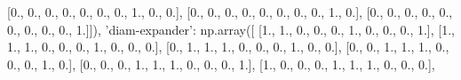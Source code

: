 \documentclass[11pt]{article}
\newenvironment{Shaded}{}{}
\newcommand{\DecValTok}[1]{\textcolor[rgb]{0.25,0.63,0.44}{{#1}}}
\newcommand{\StringTok}[1]{\textcolor[rgb]{0.25,0.44,0.63}{{#1}}}
\newcommand{\NormalTok}[1]{{#1}}
\begin{document}
\begin{Shaded}
\begin{Highlighting}[]
\NormalTok{        [}\DecValTok{0}\NormalTok{., }\DecValTok{0}\NormalTok{., }\DecValTok{0}\NormalTok{., }\DecValTok{0}\NormalTok{., }\DecValTok{0}\NormalTok{., }\DecValTok{0}\NormalTok{., }\DecValTok{0}\NormalTok{., }\DecValTok{1}\NormalTok{., }\DecValTok{0}\NormalTok{., }\DecValTok{0}\NormalTok{.],}
\NormalTok{        [}\DecValTok{0}\NormalTok{., }\DecValTok{0}\NormalTok{., }\DecValTok{0}\NormalTok{., }\DecValTok{0}\NormalTok{., }\DecValTok{0}\NormalTok{., }\DecValTok{0}\NormalTok{., }\DecValTok{0}\NormalTok{., }\DecValTok{0}\NormalTok{., }\DecValTok{1}\NormalTok{., }\DecValTok{0}\NormalTok{.],}
\NormalTok{        [}\DecValTok{0}\NormalTok{., }\DecValTok{0}\NormalTok{., }\DecValTok{0}\NormalTok{., }\DecValTok{0}\NormalTok{., }\DecValTok{0}\NormalTok{., }\DecValTok{0}\NormalTok{., }\DecValTok{0}\NormalTok{., }\DecValTok{0}\NormalTok{., }\DecValTok{0}\NormalTok{., }\DecValTok{1}\NormalTok{.]]),}
    \StringTok{'diam-expander'}\NormalTok{: np.array([}
\NormalTok{        [}\DecValTok{1}\NormalTok{., }\DecValTok{1}\NormalTok{., }\DecValTok{0}\NormalTok{., }\DecValTok{0}\NormalTok{., }\DecValTok{0}\NormalTok{., }\DecValTok{1}\NormalTok{., }\DecValTok{0}\NormalTok{., }\DecValTok{0}\NormalTok{., }\DecValTok{0}\NormalTok{., }\DecValTok{1}\NormalTok{.],}
\NormalTok{        [}\DecValTok{1}\NormalTok{., }\DecValTok{1}\NormalTok{., }\DecValTok{1}\NormalTok{., }\DecValTok{0}\NormalTok{., }\DecValTok{0}\NormalTok{., }\DecValTok{0}\NormalTok{., }\DecValTok{1}\NormalTok{., }\DecValTok{0}\NormalTok{., }\DecValTok{0}\NormalTok{., }\DecValTok{0}\NormalTok{.],}
\NormalTok{        [}\DecValTok{0}\NormalTok{., }\DecValTok{1}\NormalTok{., }\DecValTok{1}\NormalTok{., }\DecValTok{1}\NormalTok{., }\DecValTok{0}\NormalTok{., }\DecValTok{0}\NormalTok{., }\DecValTok{0}\NormalTok{., }\DecValTok{1}\NormalTok{., }\DecValTok{0}\NormalTok{., }\DecValTok{0}\NormalTok{.],}
\NormalTok{        [}\DecValTok{0}\NormalTok{., }\DecValTok{0}\NormalTok{., }\DecValTok{1}\NormalTok{., }\DecValTok{1}\NormalTok{., }\DecValTok{1}\NormalTok{., }\DecValTok{0}\NormalTok{., }\DecValTok{0}\NormalTok{., }\DecValTok{0}\NormalTok{., }\DecValTok{1}\NormalTok{., }\DecValTok{0}\NormalTok{.],}
\NormalTok{        [}\DecValTok{0}\NormalTok{., }\DecValTok{0}\NormalTok{., }\DecValTok{0}\NormalTok{., }\DecValTok{1}\NormalTok{., }\DecValTok{1}\NormalTok{., }\DecValTok{1}\NormalTok{., }\DecValTok{0}\NormalTok{., }\DecValTok{0}\NormalTok{., }\DecValTok{0}\NormalTok{., }\DecValTok{1}\NormalTok{.],}
\NormalTok{        [}\DecValTok{1}\NormalTok{., }\DecValTok{0}\NormalTok{., }\DecValTok{0}\NormalTok{., }\DecValTok{0}\NormalTok{., }\DecValTok{1}\NormalTok{., }\DecValTok{1}\NormalTok{., }\DecValTok{1}\NormalTok{., }\DecValTok{0}\NormalTok{., }\DecValTok{0}\NormalTok{., }\DecValTok{0}\NormalTok{.],}

\end{Highlighting}
\end{Shaded}
\end{document}
